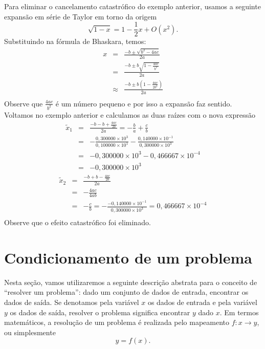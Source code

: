 \begin{ex}Para eliminar o cancelamento catastrófico do exemplo anterior, usamos a seguinte expansão em série de Taylor em torno da origem
$$
\sqrt{1-x}=1-{\frac {1}{2}}x+O(x^2) .
$$
Substituindo na fórmula de Bhaskara, temos:
\begin{eqnarray*}
x&=&\frac{-b\pm \sqrt{b^2-4ac}}{2a}\\
&=&\frac{-b\pm b\sqrt{1-\frac{4ac}{b^2}}}{2a}\\
&\approx&\frac{-b\pm b\left(1-\frac{4ac}{2b^2}\right)}{2a}\\
\end{eqnarray*}
Observe que $\frac{4ac}{b^2}$ é um número pequeno e por isso a expansão faz sentido. Voltamos no exemplo anterior e calculamos as duas raízes com o nova expressão
\begin{eqnarray*}
\tilde{x}_1&=& \frac{-b- b+\frac{4ac}{2b}}{2a} = -\frac{b}{a}+\frac{c}{b}\\
&=& -\frac{0,300000\times 10^{3}}{0,100000\times 10^{1}}-\frac{0,140000\times 10^{-1}}{0,300000\times 10^3}\\
&=& -0,300000\times 10^{3}-0,466667\times 10^{-4}\\
&=& -0,300000\times 10^{3}
\end{eqnarray*}
\begin{eqnarray*}
\tilde{x}_2&=& \frac{-b+ b-\frac{4ac}{2b}}{2a}\\
&=&-\frac{4ac}{4ab}\\
&=&-\frac{c}{b}=-\frac{-0,140000\times 10^{-1}}{0,300000\times 10^3}=0,466667\times 10^{-4}\\
\end{eqnarray*}
Observe que o efeito catastrófico foi eliminado.
\end{ex}


\section{Condicionamento de um problema}
Nesta seção, vamos utilizaremos a seguinte descrição abstrata para o conceito de ``resolver um problema'': dado um conjunto de dados de entrada, encontrar os dados de saída. Se denotamos pela variável $x$ os dados de entrada e pela variável $y$ os dados de saída, resolver o problema significa encontrar $y$ dado $x$. Em termos matemáticos, a resolução de um problema é realizada pelo mapeamento $f:x \rightarrow y$, ou simplesmente
\begin{equation*}
   y=f(x).
\end{equation*}

